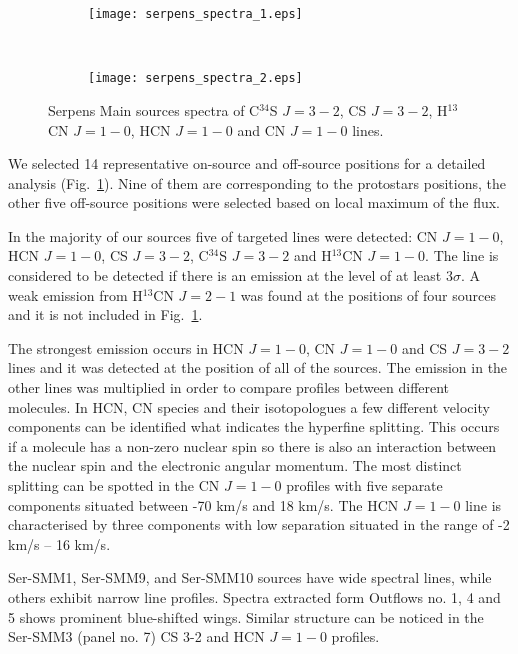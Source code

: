 \documentclass{aa}
\begin{document}
\begin{figure*}

 \begin{subfigure}{.5\textwidth}
  \label{Spectra_1}
	
  \texttt{[image: serpens\_spectra\_1.eps]}
 \end{subfigure}
  \\
 \begin{subfigure}{.5\textwidth}
  \label{Spectra_2}
  \texttt{[image: serpens\_spectra\_2.eps]}
 \end{subfigure}
\caption{Serpens Main sources spectra of C$^{34}$S $J=3-2$, CS $J=3-2$, H$^{13}$CN $J=1-0$, HCN $J=1-0$ and CN $J=1-0$ lines.}
\label{spectra}
\end{figure*}

We selected 14 representative on-source and off-source positions for a detailed analysis (Fig.~\ref{Spectra_1}). Nine of them are corresponding to the protostars positions, the other five off-source positions were selected based on local maximum of the flux.   

In the majority of our sources five of targeted lines were detected: CN $J=1-0$, HCN $J=1-0$, CS $J=3-2$, C$^{34}$S $J=3-2$ and H$^{13}$CN $J=1-0$. The line is considered to be detected if there is an emission at the level of at least 3$\sigma$. A weak emission from H$^{13}$CN $J=2-1$ was found at the positions of four sources and it is not included in Fig.~\ref{Spectra_1}. 

The strongest emission occurs in HCN $J=1-0$, CN $J=1-0$ and CS $J=3-2$ lines and it was detected at the position of all of the sources. The emission in the other lines was multiplied in order to compare profiles between different molecules. In HCN, CN species and their isotopologues a few different velocity components can be identified what indicates the hyperfine splitting. This occurs if a molecule has a non-zero nuclear spin so there is also an interaction between the nuclear spin and the electronic angular momentum. The most distinct splitting can be spotted in the CN $J=1-0$ profiles with five separate components situated between -70 km/s and 18 km/s. The HCN $J=1-0$ line is characterised by three components with low separation situated in the range of -2 km/s – 16 km/s. 

Ser-SMM1, Ser-SMM9, and Ser-SMM10 sources have wide spectral lines, while others exhibit narrow line profiles. Spectra extracted form Outflows no. 1, 4 and 5 shows prominent blue-shifted wings. Similar structure can be noticed in the Ser-SMM3 (panel no. 7) CS 3-2 and HCN $J=1-0$ profiles. 
\end{document}
